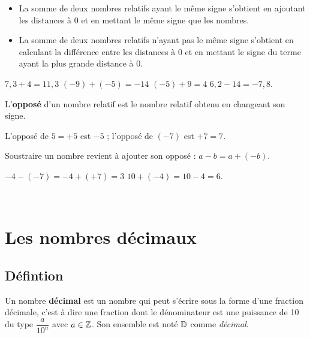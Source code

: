 \begin{propriete}[Somme]
   \begin{itemize}
      \item La somme de deux nombres relatifs ayant le même signe s'obtient en ajoutant les distances à 0 et en mettant le même signe que les nombres. 
      \item La somme de deux nombres relatifs n'ayant pas le même signe s'obtient en calculant la différence entre les distances à 0 et en mettant le signe du terme ayant la plus grande distance à 0. \\ [-8mm]
   \end{itemize}
\end{propriete}

\begin{exemple*1}
      $7,3+4=11,3$ \qquad $(-9)+(-5)=-14$ \qquad $(-5)+9= 4$ \qquad $6,2-14= -7,8$.
\end{exemple*1}

\begin{definition}[Opposé]
   L'{\bf opposé} d'un nombre relatif est le  nombre relatif obtenu en changeant son signe. 
\end{definition}

\begin{exemple*1}
   L'opposé de $5 =+5$ est $-5$ ; \qquad  l'opposé de $(-7)$ est $+7 =7$.
\end{exemple*1}

\begin{propriete}[Soustraction]
   Soustraire un nombre revient à ajouter son  opposé : $a-b=a+(-b)$.
\end{propriete}

\begin{exemple*1}
   $-4-(-7)=-4+(+7)=3$ \qquad $10+(-4) =10-4 =6$.
\end{exemple*1}

\ \\

\pagebreak


\section{Les nombres décimaux} %

\subsection{Défintion} %
           
\begin{definition}
Un nombre \textbf{décimal} est un nombre qui peut s'écrire sous la forme d'une fraction décimale, c'est à dire une fraction dont le dénominateur est une puissance de 10 du type $\dfrac{a}{10^n}$ avec $a\in{\mathbb Z}$. Son ensemble est noté ${\mathbb D}$ comme \textit{décimal}. \smallskip
\end{definition}

